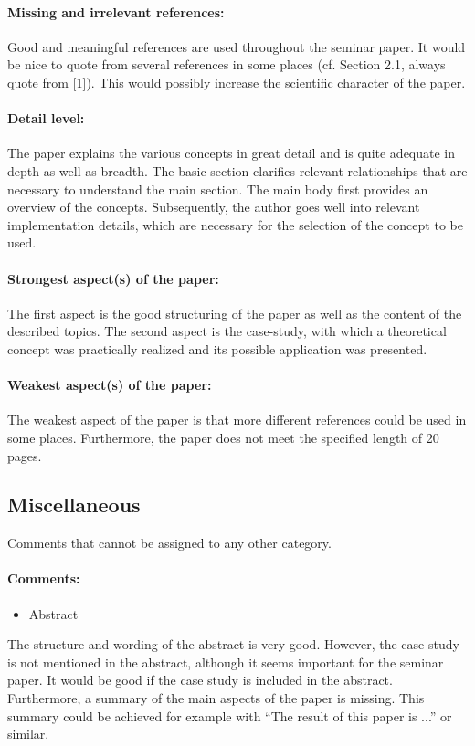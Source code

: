 \documentclass[12pt]{scrartcl}
\begin{document}
\paragraph{Missing and irrelevant references:} Good and meaningful references are used throughout the seminar paper. It would be nice to quote from several references in some places (cf. Section 2.1, always quote from [1]). 
This would possibly increase the scientific character of the paper.

\paragraph{Detail level:} The paper explains the various concepts in great detail and is quite adequate in depth as well as breadth. The basic section clarifies relevant relationships that are necessary to understand the main section. 
The main body first provides an overview of the concepts. Subsequently, the author goes well into relevant implementation details, which are necessary for the selection of the concept to be used.

\paragraph{Strongest aspect(s) of the paper:} The first aspect is the good structuring of the paper as well as the content of the described topics. The second aspect is the case-study, with which a theoretical concept was practically realized and its possible application was presented.  

\paragraph{Weakest aspect(s) of the paper:} The weakest aspect of the paper is that more different references could be used in some places. Furthermore, the paper does not meet the specified length of 20 pages. 



\subsection*{Miscellaneous}
Comments that cannot be assigned to any other category.

\paragraph{Comments:} 
\begin{itemize}
 \item Abstract
\end{itemize}
The structure and wording of the abstract is very good. However, the case study is not mentioned in the abstract, although it seems important for the seminar paper. It would be good if the case study is included in the abstract. 
Furthermore, a summary of the main aspects of the paper is missing. This summary could be achieved for example with "`The result of this paper is ..."' or similar.
\end{document}
